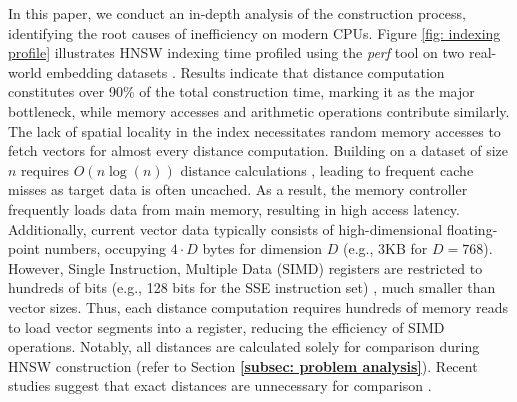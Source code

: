 In this paper, we conduct an in-depth analysis of the  construction process, identifying the root causes of inefficiency on modern CPUs. Figure \ref{fig: indexing profile} illustrates HNSW indexing time profiled using the \textit{perf} tool \cite{perf} on two real-world embedding datasets \cite{laion, argilla}. Results indicate that distance computation constitutes over 90\% of the total construction time, marking it as the major bottleneck, while memory accesses and arithmetic operations contribute similarly.
The lack of spatial locality in the  index necessitates random memory accesses to fetch vectors for almost every distance computation. Building  on a dataset of size $n$ requires $O(n\log(n))$ distance calculations \cite{HNSW}, leading to frequent cache misses as target data is often uncached. As a result, the memory controller frequently loads data from main memory, resulting in high access latency.
Additionally, current vector data typically consists of high-dimensional floating-point numbers, occupying $4\cdot D$ bytes for dimension $D$ (e.g., 3KB for $D=768$). However, Single Instruction, Multiple Data (SIMD) registers are restricted to hundreds of bits (e.g., 128 bits for the SSE instruction set) \cite{intel_simd}, much smaller than vector sizes. Thus, each distance computation requires hundreds of memory reads to load vector segments into a register, reducing the efficiency of SIMD operations. Notably, all distances are calculated solely for comparison during HNSW construction (refer to Section \textbf{\ref{subsec: problem analysis}}). Recent studies suggest that exact distances are unnecessary for comparison \cite{ADSampling,yang2024bridging,wang2024distance}.

